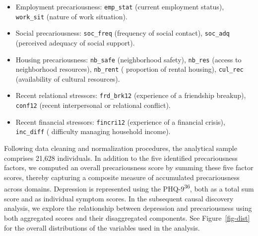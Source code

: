\documentclass[
]{article}
\providecommand{\tightlist}{%
  \setlength{\itemsep}{0pt}\setlength{\parskip}{0pt}}\usepackage{longtable,booktabs,array}
\begin{document}
\begin{itemize}
\tightlist
\item
  Employment precariousness: \texttt{emp\_stat} (current employment
  status), \texttt{work\_sit} (nature of work situation).
\item
  Social precariousness: \texttt{soc\_freq} (frequency of social
  contact), \texttt{soc\_adq} (perceived adequacy of social support).
\item
  Housing precariousness: \texttt{nb\_safe} (neighborhood safety),
  \texttt{nb\_res} (access to neighborhood resources), \texttt{nb\_rent}
  ( proportion of rental housing), \texttt{cul\_rec} (availability of
  cultural resources).
\item
  Recent relational stressors: \texttt{frd\_brk12} (experience of a
  friendship breakup), \texttt{conf12} (recent interpersonal or
  relational conflict).
\item
  Recent financial stressors: \texttt{fincri12} (experience of a
  financial crisis), \texttt{inc\_diff} ( difficulty managing household
  income).
\end{itemize}

Following data cleaning and normalization procedures, the analytical
sample comprises 21,628 individuals. In addition to the five identified
precariousness factors, we computed an overall precariousness score by
summing these five factor scores, thereby capturing a composite measure
of accumulated precariousness across domains. Depression is represented
using the PHQ-9\textsuperscript{36}, both as a total sum score and as
individual symptom scores. In the subsequent causal discovery analysis,
we explore the relationship between depression and precariousness using
both aggregated scores and their disaggregated components. See
Figure~\ref{fig-dist} for the overall distributions of the variables
used in the analysis.
\end{document}
